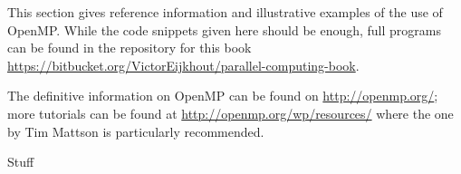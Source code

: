 
This section gives reference information and illustrative examples
of the use of OpenMP. While the code snippets given here should be enough,
full programs can be found in the repository for this book
\url{https://bitbucket.org/VictorEijkhout/parallel-computing-book}.

The definitive information on OpenMP can be found on
\url{http://openmp.org/}; more tutorials can be found at
\url{http://openmp.org/wp/resources/} where the one
by Tim Mattson is particularly recommended.

 {Stuff}


